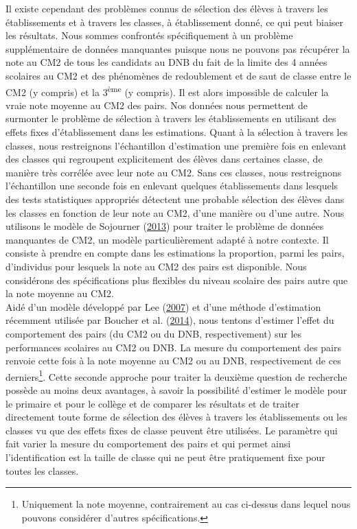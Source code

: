 \documentclass[
]{book}
\begin{document}
Il existe cependant des problèmes connus de sélection des élèves à travers les établissements et à travers les classes, à établissement donné, ce qui peut biaiser les résultats. Nous sommes confrontés spécifiquement à un problème supplémentaire de données manquantes puisque nous ne pouvons pas récupérer la note au CM2 de tous les candidats au DNB du fait de la limite des 4 années scolaires au CM2 et des phénomènes de redoublement et de saut de classe entre le CM2 (y compris) et la 3\textsuperscript{ème} (y compris). Il est alors impossible de calculer la vraie note moyenne au CM2 des pairs. Nos données nous permettent de surmonter le problème de sélection à travers les établissements en utilisant des effets fixes d'établissement dans les estimations. Quant à la sélection à travers les classes, nous restreignons l'échantillon d'estimation une première fois en enlevant des classes qui regroupent explicitement des élèves dans certaines classe, de manière très corrélée avec leur note au CM2. Sans ces classes, nous restreignons l'échantillon une seconde fois en enlevant quelques établissements dans lesquels des tests statistiques appropriés détectent une probable sélection des élèves dans les classes en fonction de leur note au CM2, d'une manière ou d'une autre. Nous utilisons le modèle de Sojourner (\protect\hyperlink{ref-SOJ:13}{2013}) pour traiter le problème de données manquantes de CM2, un modèle particulièrement adapté à notre contexte. Il consiste à prendre en compte dans les estimations la proportion, parmi les pairs, d'individus pour lesquels la note au CM2 des pairs est disponible. Nous considérons des spécifications plus flexibles du niveau scolaire des pairs autre que la note moyenne au CM2.\\
Aidé d'un modèle développé par Lee (\protect\hyperlink{ref-LEE:07}{2007}) et d'une méthode d'estimation récemment utilisée par Boucher et al. (\protect\hyperlink{ref-BOU:eal:14}{2014}), nous tentons d'estimer l'effet du comportement des pairs (du CM2 ou du DNB, respectivement) sur les performances scolaires au CM2 ou DNB. La mesure du comportement des pairs renvoie cette fois à la note moyenne au CM2 ou au DNB, respectivement de ces derniers\footnote{Uniquement la note moyenne, contrairement au cas ci-dessus dans lequel nous pouvons considérer d'autres spécifications.}. Cette seconde approche pour traiter la deuxième question de recherche possède au moins deux avantages, à savoir la possibilité d'estimer le modèle pour le primaire et pour le collège et de comparer les résultats et de traiter directement toute forme de sélection des élèves à travers les établissements ou les classes vu que des effets fixes de classe peuvent être utilisées. Le paramètre qui fait varier la mesure du comportement des pairs et qui permet ainsi l'identification est la taille de classe qui ne peut être pratiquement fixe pour toutes les classes.
\end{document}
